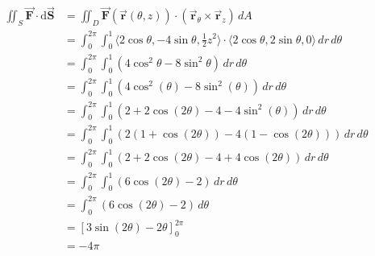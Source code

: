 \documentclass[letter,11pt]{article}
\begin{document}
\begin{enumerate}[label = \alph*.]
    \begin{align*}
        \iint_S \vec{\mathbf{F}} \cdot \mathrm{d} \vec{\mathbf{S}}&=\iint_D \vec{\mathbf{F}}(\vec{\mathbf{r}}(\theta, z)) \cdot\left(\vec{\mathbf{r}}_\theta \times \vec{\mathbf{r}}_z\right) \, dA\\
        &= \int_{0}^{2\pi}\int_{0}^{1} \langle2\cos\theta,-4\sin\theta,\frac{1}{2}z^{2}\rangle \cdot\langle 2\cos\theta,2\sin\theta, 0\rangle \, dr\,d\theta\\
        &= \int_{0}^{2\pi}\int_{0}^{1}\left(4\cos^{2}\theta-8\sin^{2}\theta\right)\,dr\,d\theta\\
        &= \int_{0}^{2\pi}\int_{0}^{1}\left(4\cos^{2}\left(\theta\right)-8\sin^{2}\left(\theta\right)\right)\, dr\, d\theta\\
        &= \int_{0}^{2\pi}\int_{0}^{1}\left(2+2\cos\left(2\theta\right)-4-4\sin^{2}\left(\theta\right)\right)\, dr\, d\theta\\
        &= \int_{0}^{2\pi}\int_{0}^{1}\left(2\left(1+\cos\left(2\theta\right)\right)-4\left(1-\cos\left(2\theta\right)\right)\right)\, dr\, d\theta\\
        &= \int_{0}^{2\pi}\int_{0}^{1}\left(2+2\cos\left(2\theta\right)-4+4\cos\left(2\theta\right)\right)\, dr\, d\theta\\
        &= \int_{0}^{2\pi}\int_{0}^{1}\left(6\cos\left(2\theta\right)-2\right)\, dr\, d\theta\\
        &= \int_{0}^{2\pi}\left(6\cos\left(2\theta\right)-2\right)\, d\theta\\
        &= \left[3\sin\left(2\theta\right)-2\theta\right]_{0}^{2\pi}\\
        &= \boxed{-4\pi}
    \end{align*}
\end{enumerate}
\end{document}
